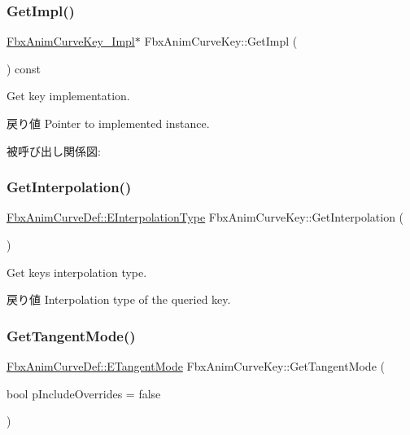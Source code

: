 \subsubsection{\texorpdfstring{Get\+Impl()}{GetImpl()}}
{\footnotesize\ttfamily \hyperlink{class_fbx_anim_curve_key___impl}{Fbx\+Anim\+Curve\+Key\+\_\+\+Impl}$\ast$ Fbx\+Anim\+Curve\+Key\+::\+Get\+Impl (\begin{DoxyParamCaption}{ }\end{DoxyParamCaption}) const}

Get key implementation. \begin{DoxyReturn}{戻り値}
Pointer to implemented instance. 
\end{DoxyReturn}
被呼び出し関係図\+:
\mbox{\label{class_fbx_anim_curve_key_afe707d042861d5f6d5e22f4811a725ac}} 
\subsubsection{\texorpdfstring{Get\+Interpolation()}{GetInterpolation()}}
{\footnotesize\ttfamily \hyperlink{class_fbx_anim_curve_def_add2ab7d10d856ab0868cc9b143d59ea5}{Fbx\+Anim\+Curve\+Def\+::\+E\+Interpolation\+Type} Fbx\+Anim\+Curve\+Key\+::\+Get\+Interpolation (\begin{DoxyParamCaption}{ }\end{DoxyParamCaption})}

Get key\textquotesingle{}s interpolation type. \begin{DoxyReturn}{戻り値}
Interpolation type of the queried key. 
\end{DoxyReturn}
\mbox{\label{class_fbx_anim_curve_key_a3821c01c7e1b422efcf2fedd074ffb6a}} 
\subsubsection{\texorpdfstring{Get\+Tangent\+Mode()}{GetTangentMode()}}
{\footnotesize\ttfamily \hyperlink{class_fbx_anim_curve_def_ac810ccc5ca0527704ab5175479964b87}{Fbx\+Anim\+Curve\+Def\+::\+E\+Tangent\+Mode} Fbx\+Anim\+Curve\+Key\+::\+Get\+Tangent\+Mode (\begin{DoxyParamCaption}\item[{bool}]{p\+Include\+Overrides = {\ttfamily false} }\end{DoxyParamCaption})}

